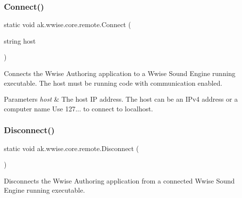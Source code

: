 \subsubsection{\texorpdfstring{Connect()}{Connect()}}
{\footnotesize\ttfamily static void ak.\+wwise.\+core.\+remote.\+Connect (\begin{DoxyParamCaption}\item[{string}]{host }\end{DoxyParamCaption})\hspace{0.3cm}{\ttfamily [static]}}



Connects the Wwise Authoring application to a Wwise Sound Engine running executable. The host must be running code with communication enabled. 


\begin{DoxyParams}{Parameters}
{\em host} & The host IP address. The host can be an I\+Pv4 address or a computer name Use 127... to connect to localhost.\\
\hline
\end{DoxyParams}
\mbox{\label{classak_1_1wwise_1_1core_1_1remote_a18eafbd35646e075e9ac8c555760ab25}} 
\subsubsection{\texorpdfstring{Disconnect()}{Disconnect()}}
{\footnotesize\ttfamily static void ak.\+wwise.\+core.\+remote.\+Disconnect (\begin{DoxyParamCaption}{ }\end{DoxyParamCaption})\hspace{0.3cm}{\ttfamily [static]}}



Disconnects the Wwise Authoring application from a connected Wwise Sound Engine running executable. 

\mbox{\label{classak_1_1wwise_1_1core_1_1remote_aeead07e8dea8f4c2c2a315976169d207}} 
